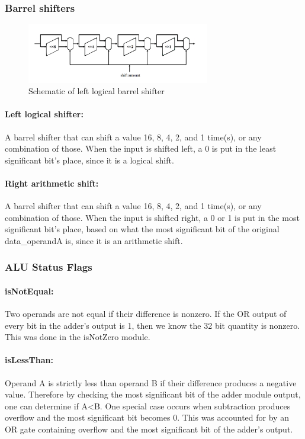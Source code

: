 \documentclass[letterpaper]{article}
\begin{document}
\subsubsection{Barrel shifters}
\begin{figure}[h]
    \centering
    \includegraphics[width=8cm]{Barrelshift.png}
    \caption{Schematic of left logical barrel shifter}
    \label{fig:my_label}
\end{figure}
\paragraph{Left logical shifter:}
A barrel shifter that can shift a value 16, 8, 4, 2, and 1 time(s), or any combination of those. When the input is shifted left, a 0 is put in the least significant bit's place, since it is a logical shift.
\paragraph{Right arithmetic shift:}
A barrel shifter that can shift a value 16, 8, 4, 2, and 1 time(s), or any combination of those. When the input is shifted right, a 0 or 1 is put in the most significant bit's place, based on what the most significant bit of the original data\_operandA is, since it is an arithmetic shift.

\subsubsection{ALU Status Flags}
\paragraph{isNotEqual:} Two operands are not equal if their difference is nonzero. If the OR output of every bit in the adder's output is 1, then we know the 32 bit quantity is nonzero. This was done in the isNotZero module. \newline

\paragraph{isLessThan:} Operand A is strictly less than operand B if their difference produces a negative value. Therefore by checking the most significant bit of the adder module output, one can determine if A<B. One special case occurs when subtraction produces overflow and the most significant bit becomes 0. This was accounted for by an OR gate containing overflow and the most significant bit of the adder's output. \newline
\end{document}
